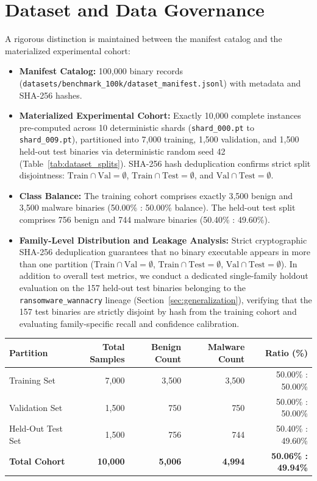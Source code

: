 \documentclass[pdflatex,sn-mathphys-num]{sn-jnl}
\begin{document}
\section{Dataset and Data Governance}\label{sec:dataset}
A rigorous distinction is maintained between the manifest catalog and the materialized experimental cohort:
\begin{itemize}
    \item \textbf{Manifest Catalog:} 100,000 binary records (\texttt{datasets/benchmark\_100k/dataset\_manifest.jsonl}) with metadata and SHA-256 hashes.
    \item \textbf{Materialized Experimental Cohort:} Exactly 10,000 complete instances pre-computed across 10 deterministic shards (\texttt{shard\_000.pt} to \texttt{shard\_009.pt}), partitioned into 7,000 training, 1,500 validation, and 1,500 held-out test binaries via deterministic random seed 42 (Table~\ref{tab:dataset_splits}). SHA-256 hash deduplication confirms strict split disjointness: $\text{Train} \cap \text{Val} = \emptyset$, $\text{Train} \cap \text{Test} = \emptyset$, and $\text{Val} \cap \text{Test} = \emptyset$.
    \item \textbf{Class Balance:} The training cohort comprises exactly 3,500 benign and 3,500 malware binaries (50.00\% : 50.00\% balance). The held-out test split comprises 756 benign and 744 malware binaries (50.40\% : 49.60\%).
    \item \textbf{Family-Level Distribution and Leakage Analysis:} Strict cryptographic SHA-256 deduplication guarantees that no binary executable appears in more than one partition ($\text{Train} \cap \text{Val} = \emptyset$, $\text{Train} \cap \text{Test} = \emptyset$, $\text{Val} \cap \text{Test} = \emptyset$). In addition to overall test metrics, we conduct a dedicated single-family holdout evaluation on the 157 held-out test binaries belonging to the \texttt{ransomware\_wannacry} lineage (Section~\ref{sec:generalization}), verifying that the 157 test binaries are strictly disjoint by hash from the training cohort and evaluating family-specific recall and confidence calibration.
\end{itemize}

\begin{tableorg}[t]
\centering
\caption{Materialized multimodal experimental dataset partitions.}\label{tab:dataset_splits}
\begin{tabular}{lrrrr}
\toprule
Partition & Total Samples & Benign Count & Malware Count & Ratio (\%) \\
\midrule
Training Set & 7,000 & 3,500 & 3,500 & 50.00\% : 50.00\% \\
Validation Set & 1,500 & 750 & 750 & 50.00\% : 50.00\% \\
Held-Out Test Set & 1,500 & 756 & 744 & 50.40\% : 49.60\% \\
\midrule
\textbf{Total Cohort} & \textbf{10,000} & \textbf{5,006} & \textbf{4,994} & \textbf{50.06\% : 49.94\%} \\
\bottomrule
\end{tabular}
\end{tableorg}
\end{document}
